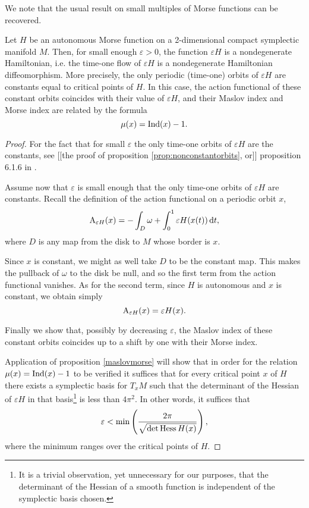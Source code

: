 We note that the usual result on small multiples of Morse functions can be recovered.

\begin{corollary}\label{cor:orbitsepsH}
Let $H$ be an autonomous Morse function on a 2-dimensional compact symplectic manifold $M$. Then, for small enough $\varepsilon > 0$, the function $\varepsilon H$ is a nondegenerate Hamiltonian, i.e. the time-one flow of $\varepsilon H$ is a nondegenerate Hamiltonian diffeomorphism. More precisely, the only periodic (time-one) orbits of $\varepsilon H$ are constants equal to critical points of $H$. In this case, the action functional of these constant orbits coincides with their value of $\varepsilon H$, and their Maslov index and Morse index are related by the formula
\begin{equation}
\mu(x) = \Ind(x) - 1.
\end{equation}
\end{corollary}

\begin{proof}
For the fact that for small $\varepsilon$ the only time-one orbits of $\varepsilon H$ are the constants, see [[the proof of proposition \ref{prop:nonconstantorbits}, or]] proposition 6.1.6 in \cite{audin}.

Assume now that $\varepsilon$ is small enough that the only time-one orbits of $\varepsilon H$ are constants. Recall the definition of the action functional on a periodic orbit $x$,
\begin{equation}
\AA_{\varepsilon H}(x) = - \int_D \omega + \int_0^1 \varepsilon H(x(t)) \dl t,
\end{equation}
where $D$ is any map from the disk to $M$ whose border is $x$.

Since $x$ is constant, we might as well take $D$ to be the constant map. This makes the pullback of $\omega$ to the disk be null, and so the first term from the action functional vanishes. As for the second term, since $H$ is autonomous and $x$ is constant, we obtain simply
\begin{equation}
\AA_{\varepsilon H}(x) = \varepsilon H(x).
\end{equation}

Finally we show that, possibly by decreasing $\varepsilon$, the Maslov index of these constant orbits coincides up to a shift by one with their Morse index.

Application of proposition \ref{maslovmorse} will show that in order for the relation $\mu(x) = \Ind(x) - 1$ to be verified it suffices that for every critical point $x$ of $H$ there exists a symplectic basis for $T_x M$ such that the determinant of the Hessian of $\varepsilon H$ in that basis\footnote{It is a trivial observation, yet unnecessary for our purposes, that the determinant of the Hessian of a smooth function is independent of the symplectic basis chosen.} is less than $4 \pi^2$. In other words, it suffices that
\begin{equation}
\varepsilon < \min \left( \frac{2\pi}{\sqrt{\det \hessian H(x)}}\right),
\end{equation}
where the minimum ranges over the critical points of $H$.
\end{proof}

